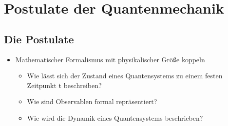 \documentclass[10pt,article,colorback,accentcolor=tud9d]{scrartcl}
\begin{document}
\section{Postulate der Quantenmechanik}
\subsection{Die Postulate}
  \begin{itemize}
    \item Mathematischer Formalismus mit physikalischer Größe koppeln
      \begin{itemize}
        \item Wie lässt sich der Zustand eines Quantensystems zu einem festen Zeitpunkt t beschreiben?
        \item Wie sind Observablen formal repräsentiert?
        \item Wie wird die Dynamik eines Quantensystems beschrieben?
      \end{itemize}
  \end{itemize}
  
\end{document}
